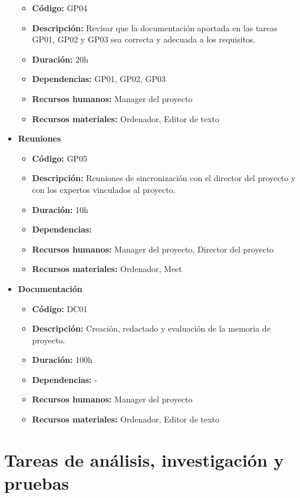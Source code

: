 \begin{itemize}
        \begin{itemize}
            \item \textbf{Código:} GP04
            \item \textbf{Descripción:} Revisar que la documentación aportada en las tareas GP01, GP02 y GP03 sea correcta y adecuada a los requisitos.
            \item \textbf{Duración:} 20h
            \item \textbf{Dependencias:} GP01, GP02, GP03
            \item \textbf{Recursos humanos:} Manager del proyecto
            \item \textbf{Recursos materiales:} Ordenador, Editor de texto
        \end{itemize}
    \item \textbf{Reuniones}
        \begin{itemize}
            \item \textbf{Código:} GP05
            \item \textbf{Descripción:} Reuniones de sincronización con el director del proyecto y con los expertos vinculados al proyecto.
            \item \textbf{Duración:} 10h
            \item \textbf{Dependencias:}
            \item \textbf{Recursos humanos:} Manager del proyecto, Director del proyecto
            \item \textbf{Recursos materiales:} Ordenador, Meet
        \end{itemize}
    \item \textbf{Documentación}
        \begin{itemize}
            \item \textbf{Código:} DC01
            \item \textbf{Descripción:} Creación, redactado y evaluación de la memoria de proyecto.
            \item \textbf{Duración:} 100h
            \item \textbf{Dependencias:} -
            \item \textbf{Recursos humanos:} Manager del proyecto
            \item \textbf{Recursos materiales:} Ordenador, Editor de texto
        \end{itemize}
\end{itemize}

\section{Tareas de análisis, investigación y pruebas}
\label{sec:tareas_analisis}

